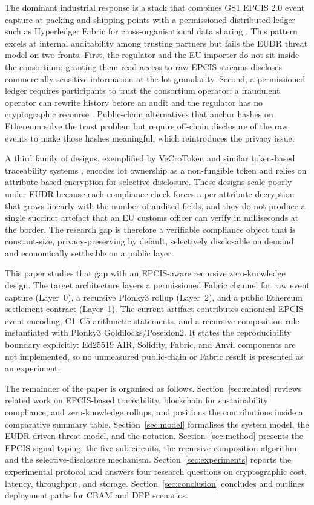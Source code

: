\documentclass[journal]{IEEEtran}
\begin{document}
The dominant industrial response is a stack that combines GS1 EPCIS 2.0 event capture at packing and shipping points with a permissioned distributed ledger such as Hyperledger Fabric for cross-organisational data sharing \cite{androulaki2018fabric, saberi2019blockchain}. This pattern excels at internal auditability among trusting partners but fails the EUDR threat model on two fronts. First, the regulator and the EU importer do not sit inside the consortium; granting them read access to raw EPCIS streams discloses commercially sensitive information at the lot granularity. Second, a permissioned ledger requires participants to trust the consortium operator; a fraudulent operator can rewrite history before an audit and the regulator has no cryptographic recourse \cite{kosba2016hawk}. Public-chain alternatives that anchor hashes on Ethereum solve the trust problem but require off-chain disclosure of the raw events to make those hashes meaningful, which reintroduces the privacy issue.

A third family of designs, exemplified by VeCroToken and similar token-based traceability systems \cite{saberi2019blockchain}, encodes lot ownership as a non-fungible token and relies on attribute-based encryption for selective disclosure. These designs scale poorly under EUDR because each compliance check forces a per-attribute decryption that grows linearly with the number of audited fields, and they do not produce a single succinct artefact that an EU customs officer can verify in milliseconds at the border. The research gap is therefore a verifiable compliance object that is constant-size, privacy-preserving by default, selectively disclosable on demand, and economically settleable on a public layer.

This paper studies that gap with an EPCIS-aware recursive zero-knowledge design. The target architecture layers a permissioned Fabric channel for raw event capture (Layer~0), a recursive Plonky3 rollup (Layer~2), and a public Ethereum settlement contract (Layer~1). The current artifact contributes canonical EPCIS event encoding, C1--C5 arithmetic statements, and a recursive composition rule instantiated with Plonky3 Goldilocks/Poseidon2. It states the reproducibility boundary explicitly: Ed25519 AIR, Solidity, Fabric, and Anvil components are not implemented, so no unmeasured public-chain or Fabric result is presented as an experiment.

The remainder of the paper is organised as follows. Section~\ref{sec:related} reviews related work on EPCIS-based traceability, blockchain for sustainability compliance, and zero-knowledge rollups, and positions the contributions inside a comparative summary table. Section~\ref{sec:model} formalises the system model, the EUDR-driven threat model, and the notation. Section~\ref{sec:method} presents the EPCIS signal typing, the five sub-circuits, the recursive composition algorithm, and the selective-disclosure mechanism. Section~\ref{sec:experiments} reports the experimental protocol and answers four research questions on cryptographic cost, latency, throughput, and storage. Section~\ref{sec:conclusion} concludes and outlines deployment paths for CBAM and DPP scenarios.
\end{document}
